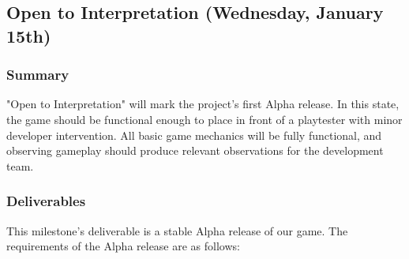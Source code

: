 \subsection{Open to Interpretation (Wednesday, January 15th)}

\subsubsection*{Summary}
"Open to Interpretation" will mark the project's first Alpha release. In this state, the game should be functional enough to place in front of a playtester with minor developer intervention. All basic game mechanics will be fully functional, and observing gameplay should produce relevant observations for the development team.

\subsubsection*{Deliverables}
This milestone’s deliverable is a stable Alpha release of our game. The requirements of the Alpha release are as follows:

